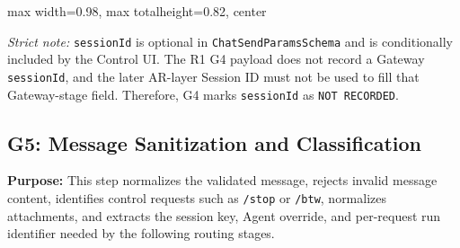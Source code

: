 \begin{center}
\begin{adjustbox}{
max width=0.98\textwidth,
max totalheight=0.82\textheight,
center
}

\end{adjustbox}

\end{center}

\textit{Strict note:}
\texttt{sessionId} is optional in \texttt{ChatSendParamsSchema} and is
conditionally included by the Control UI. The R1 G4 payload does not
record a Gateway \texttt{sessionId}, and the later AR-layer Session ID
must not be used to fill that Gateway-stage field. Therefore, G4 marks
\texttt{sessionId} as \texttt{NOT RECORDED}.


\subsection*{G5: Message Sanitization and Classification}

\textbf{Purpose:}
This step normalizes the validated message, rejects invalid message
content, identifies control requests such as \texttt{/stop} or
\texttt{/btw}, normalizes attachments, and extracts the session key,
Agent override, and per-request run identifier needed by the following
routing stages.

